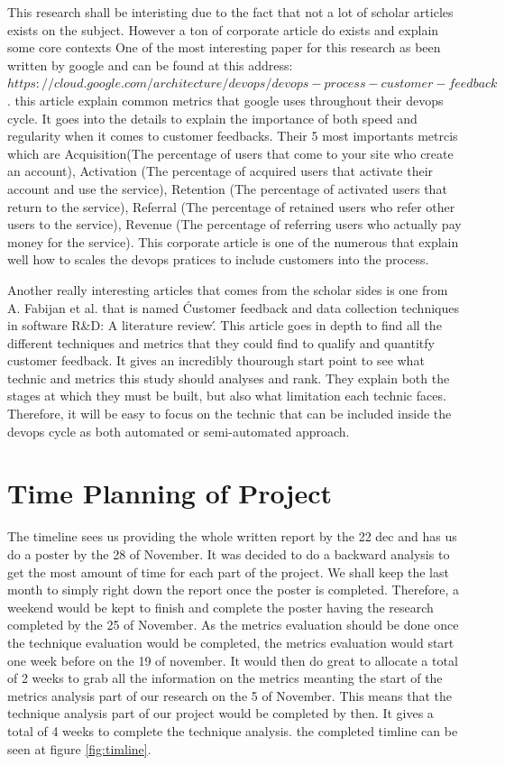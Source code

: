 \documentclass[10pt, conference]{IEEEtran}
\begin{document}
This research shall be interisting due to the fact that not a lot of scholar articles exists on the subject.
However a ton of corporate article do exists and explain some core contexts 
One of the most interesting paper for this research as been written by google and can be found at this address: $https://cloud.google.com/architecture/devops/devops-process-customer-feedback$.
this article explain common metrics that google uses throughout their devops cycle. 
It goes into the details to explain the importance of both speed and regularity when it comes to customer feedbacks.
Their 5 most importants metrcis which are Acquisition(The percentage of users that come to your site who create an account),
Activation (The percentage of acquired users that activate their account and use the service),
Retention (The percentage of activated users that return to the service),
Referral (The percentage of retained users who refer other users to the service),
Revenue (The percentage of referring users who actually pay money for the service).
This corporate article is one of the numerous that explain well how to scales the devops pratices to include customers into the process.

Another really interesting articles that comes from the scholar sides is one from A. Fabijan et al. that is named \'Customer feedback and data collection techniques in software R\&D: A literature review\'. 
This article goes in depth to find all the different techniques and metrics that they could find to qualify and quantitfy customer feedback. 
It gives an incredibly thourough start point to see what technic and metrics this study should analyses and rank.
They explain both the stages at which they must be built, but also what limitation each technic faces.
Therefore, it will be easy to focus on the technic that can be included inside the devops cycle as both automated or semi-automated approach.

\section{Time Planning of Project}
\label{sec:schedule}

The timeline sees us providing the whole written report by the 22 dec and has us do a poster by the 28 of November. 
It was decided to do a backward analysis to get the most amount of time for each part of the project.
We shall keep the last month to simply right down the report once the poster is completed.
Therefore, a weekend would be kept to finish and complete the poster having the research completed by the 25 of November.
As the metrics evaluation should be done once the technique evaluation would be completed, the metrics evaluation would start one week before on the 19 of november.
It would then do great to allocate a total of 2 weeks to grab all the information on the metrics meanting the start of the metrics analysis part of our research on the 5 of November.
This means that the technique analysis part of our project would be completed by then.
It gives a total of 4 weeks to complete the technique analysis. the completed timline can be seen at figure \ref{fig:timline}.
\end{document}
